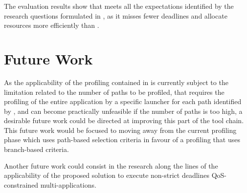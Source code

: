 The evaluation results show that \tool meets all the expectations identified by the research questions formulated in , as it misses fewer deadlines and allocate resources more efficiently than \cSpark. 

\section{Future Work}\label{sec:future_work}
As the applicability of the profiling contained in \tool is currently subject to the limitation related to the number of paths to be profiled, that requires the profiling of the entire application by a specific launcher for each path identified by \dSymb, and can become practically unfeasible if the number of paths is too high, a desirable future work could be directed at improving this part of the tool chain. This future work would be focused to moving away from the current profiling phase which uses path-based selection criteria in favour of a profiling  that uses branch-based criteria. 
 
Another future work could consist in the research along the lines of the applicability of the proposed solution to execute non-strict deadlines QoS-constrained multi-\plan applications.


